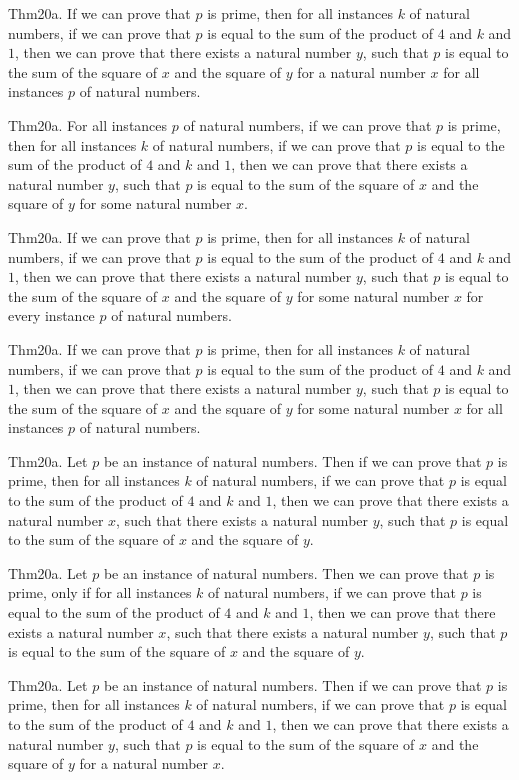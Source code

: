 \documentclass{article}
\begin{document}
Thm20a. If we can prove that $p$ is prime, then for all instances $k$ of natural numbers, if we can prove that $p$ is equal to the sum of the product of $4$ and $k$ and $1$, then we can prove that there exists a natural number $y$, such that $p$ is equal to the sum of the square of $x$ and the square of $y$ for a natural number $x$ for all instances $p$ of natural numbers.

Thm20a. For all instances $p$ of natural numbers, if we can prove that $p$ is prime, then for all instances $k$ of natural numbers, if we can prove that $p$ is equal to the sum of the product of $4$ and $k$ and $1$, then we can prove that there exists a natural number $y$, such that $p$ is equal to the sum of the square of $x$ and the square of $y$ for some natural number $x$.

Thm20a. If we can prove that $p$ is prime, then for all instances $k$ of natural numbers, if we can prove that $p$ is equal to the sum of the product of $4$ and $k$ and $1$, then we can prove that there exists a natural number $y$, such that $p$ is equal to the sum of the square of $x$ and the square of $y$ for some natural number $x$ for every instance $p$ of natural numbers.

Thm20a. If we can prove that $p$ is prime, then for all instances $k$ of natural numbers, if we can prove that $p$ is equal to the sum of the product of $4$ and $k$ and $1$, then we can prove that there exists a natural number $y$, such that $p$ is equal to the sum of the square of $x$ and the square of $y$ for some natural number $x$ for all instances $p$ of natural numbers.

Thm20a. Let $p$ be an instance of natural numbers. Then if we can prove that $p$ is prime, then for all instances $k$ of natural numbers, if we can prove that $p$ is equal to the sum of the product of $4$ and $k$ and $1$, then we can prove that there exists a natural number $x$, such that there exists a natural number $y$, such that $p$ is equal to the sum of the square of $x$ and the square of $y$.

Thm20a. Let $p$ be an instance of natural numbers. Then we can prove that $p$ is prime, only if for all instances $k$ of natural numbers, if we can prove that $p$ is equal to the sum of the product of $4$ and $k$ and $1$, then we can prove that there exists a natural number $x$, such that there exists a natural number $y$, such that $p$ is equal to the sum of the square of $x$ and the square of $y$.

Thm20a. Let $p$ be an instance of natural numbers. Then if we can prove that $p$ is prime, then for all instances $k$ of natural numbers, if we can prove that $p$ is equal to the sum of the product of $4$ and $k$ and $1$, then we can prove that there exists a natural number $y$, such that $p$ is equal to the sum of the square of $x$ and the square of $y$ for a natural number $x$.
\end{document}
